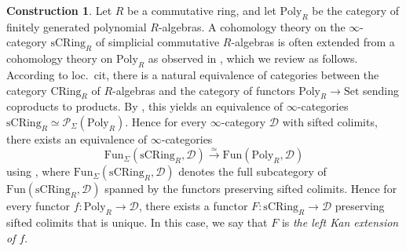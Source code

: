 \documentclass[10pt]{amsart}
\theoremstyle{definition}
\newtheorem{const}[thm]{Construction}
\numberwithin{equation}{section}
\newcommand{\cD}{\mathcal{D}}
\newcommand{\cP}{\mathcal{P}}
\newcommand{\CRing}{\mathrm{CRing}}
\newcommand{\sCRing}{\mathrm{sCRing}}
\newcommand{\Fun}{\mathrm{Fun}}
\newcommand{\Poly}{\mathrm{Poly}}
\newcommand{\Set}{\mathrm{Set}}
\begin{document}
\begin{const}
\label{left Kan}
Let $R$ be a commutative ring,
and let $\Poly_R$ be the category of finitely generated polynomial $R$-algebras.
A cohomology theory on the $\infty$-category $\sCRing_R$ of simplicial
commutative $R$-algebras is often
extended from a cohomology theory on $\Poly_R$ as observed in \cite[Construction  2.1]{BMS19},
which we review as follows.
According to loc.\ cit,
there is a natural equivalence of categories between the category $\CRing_R$ of $R$-algebras and the category of functors $\Poly_R\to \Set$ sending coproducts to products.
By \cite[Corollary 5.5.9.3]{HTT},
this yields an equivalence of $\infty$-categories
$\sCRing_R \simeq \cP_{\Sigma}(\Poly_R)$.
Hence for every $\infty$-category $\cD$ with sifted colimits,
there exists an equivalence of $\infty$-categories
\begin{equation}
\Fun_\Sigma(\sCRing_R,\cD)
\xrightarrow{\simeq}
\Fun(\Poly_R,\cD)
\end{equation}
using \cite[Proposition 5.5.8.15]{HTT},
where $\Fun_\Sigma(\sCRing_R,\cD)$ denotes the full subcategory of $\Fun(\sCRing_R,\cD)$ spanned by the functors preserving sifted colimits. 
Hence for every functor $f\colon \Poly_R\to \cD$,
there exists a functor $F\colon \sCRing_R\to \cD$ preserving sifted colimits that is unique.
In this case,
we say that $F$ is \emph{the left Kan extension of $f$}.
\end{const}
\end{document}

